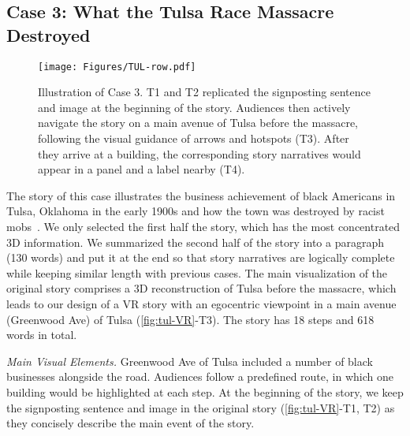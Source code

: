 \subsection{Case 3: What the Tulsa Race Massacre Destroyed}
\label{subsec:case3}
\begin{figure*}[t]
\centering
  \texttt{[image: Figures/TUL-row.pdf]}
  \caption{Illustration of Case 3. T1 and T2 replicated the signposting sentence and image at the beginning of the story. Audiences then actively navigate the story on a main avenue of Tulsa before the massacre, following the visual guidance of arrows and hotspots (T3). After they arrive at a building, the corresponding story narratives would appear in a panel and a label nearby (T4).}
  \label{fig:tul-VR}
\end{figure*}
The story of this case illustrates the business achievement of black Americans in Tulsa, Oklahoma in the early 1900s and how the town was destroyed by racist mobs~\cite{tulsa}. We only selected the first half the story, which has the most concentrated 3D information. We summarized the second half of the story into a paragraph (130 words) and put it at the end so that story narratives are logically complete while keeping similar length with previous cases. The main visualization of the original story comprises a 3D reconstruction of Tulsa before the massacre, which leads to our design of a VR story with an egocentric viewpoint in a main avenue (Greenwood Ave) of Tulsa (\autoref{fig:tul-VR}-T3). {The story has 18 steps and 618 words in total.}

\textit{Main Visual Elements.} Greenwood Ave of Tulsa included a number of black businesses alongside the road. Audiences follow a predefined route, in which one building would be highlighted at each step. At the beginning of the story, we keep the signposting sentence and image in the original story (\autoref{fig:tul-VR}-T1, T2) as they concisely describe the main event of the story.

